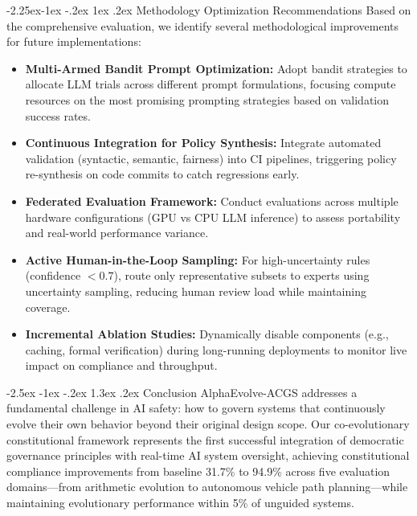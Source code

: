 \documentclass[manuscript,screen,review,anonymous,9pt]{acmart}
\makeatletter
\renewcommand\section{\@startsection{section}{1}{\z@}%
  {-2.5ex \@plus -1ex \@minus -.2ex}%
  {1.3ex \@plus.2ex}%
  {\normalfont\Large\bfseries}}
\renewcommand\subsection{\@startsection{subsection}{2}{\z@}%
  {-2.25ex\@plus -1ex \@minus -.2ex}%
  {1ex \@plus .2ex}%
  {\normalfont\large\bfseries}}
\makeatother
\begin{document}
\subsection{Methodology Optimization Recommendations}
\label{subsec:methodology_optimization}
Based on the comprehensive evaluation, we identify several methodological improvements for future implementations:

\begin{itemize}
    \item \textbf{Multi-Armed Bandit Prompt Optimization:} Adopt bandit strategies to allocate LLM trials across different prompt formulations, focusing compute resources on the most promising prompting strategies based on validation success rates.
    \item \textbf{Continuous Integration for Policy Synthesis:} Integrate automated validation (syntactic, semantic, fairness) into CI pipelines, triggering policy re-synthesis on code commits to catch regressions early.
    \item \textbf{Federated Evaluation Framework:} Conduct evaluations across multiple hardware configurations (GPU vs CPU LLM inference) to assess portability and real-world performance variance.
    \item \textbf{Active Human-in-the-Loop Sampling:} For high-uncertainty rules (confidence $< 0.7$), route only representative subsets to experts using uncertainty sampling, reducing human review load while maintaining coverage.
    \item \textbf{Incremental Ablation Studies:} Dynamically disable components (e.g., caching, formal verification) during long-running deployments to monitor live impact on compliance and throughput.
\end{itemize}

\section{Conclusion}
\label{sec:conclusion}
AlphaEvolve-ACGS addresses a fundamental challenge in AI safety: how to govern systems that continuously evolve their own behavior beyond their original design scope. Our co-evolutionary constitutional framework represents the first successful integration of democratic governance principles with real-time AI system oversight, achieving constitutional compliance improvements from baseline 31.7\% to 94.9\% across five evaluation domains---from arithmetic evolution to autonomous vehicle path planning---while maintaining evolutionary performance within 5\% of unguided systems.
\end{document}
